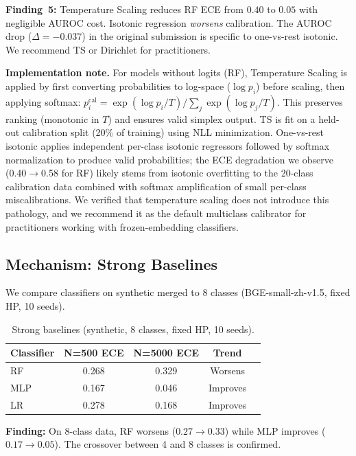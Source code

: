\documentclass[11pt]{article}
\begin{document}
\textbf{Finding~5:} Temperature Scaling reduces RF ECE from $0.40$ to $0.05$ with negligible AUROC cost. Isotonic regression \emph{worsens} calibration. The AUROC drop ($\Delta{=}{-}0.037$) in the original submission is specific to one-vs-rest isotonic. We recommend TS or Dirichlet for practitioners.

\textbf{Implementation note.} For models without logits (RF), Temperature Scaling is applied by first converting probabilities to log-space ($\log p_i$) before scaling, then applying softmax: $p_i^{\text{cal}} = \exp(\log p_i / T) / \sum_j \exp(\log p_j / T)$. This preserves ranking (monotonic in $T$) and ensures valid simplex output. TS is fit on a held-out calibration split (20\% of training) using NLL minimization. One-vs-rest isotonic applies independent per-class isotonic regressors followed by softmax normalization to produce valid probabilities; the ECE degradation we observe (0.40$\to$0.58 for RF) likely stems from isotonic overfitting to the 20-class calibration data combined with softmax amplification of small per-class miscalibrations. We verified that temperature scaling does not introduce this pathology, and we recommend it as the default multiclass calibrator for practitioners working with frozen-embedding classifiers.

\subsection{Mechanism: Strong Baselines}

We compare classifiers on synthetic merged to 8 classes (BGE-small-zh-v1.5, fixed HP, 10 seeds).

\begin{table}[t]
\centering
\caption{Strong baselines (synthetic, 8 classes, fixed HP, 10 seeds).}
\label{tab:baselines_new}
\begin{tabular}{@{}lcccc@{}}
\toprule
\textbf{Classifier} & \textbf{N=500 ECE} & \textbf{N=5000 ECE} & \textbf{Trend} \\
\midrule
RF  & 0.268 & 0.329 & Worsens \\
MLP & 0.167 & 0.046 & Improves \\
LR  & 0.278 & 0.168 & Improves \\
\bottomrule
\end{tabular}
\end{table}

\textbf{Finding:} On 8-class data, RF worsens ($0.27\to 0.33$) while MLP improves ($0.17\to 0.05$). The crossover between 4 and 8 classes is confirmed.
\end{document}
